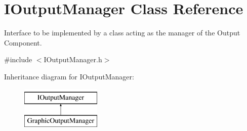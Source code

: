 \hypertarget{class_i_output_manager}{}\section{I\+Output\+Manager Class Reference}
\label{class_i_output_manager}


Interface to be implemented by a class acting as the manager of the Output Component.  




{\ttfamily \#include $<$I\+Output\+Manager.\+h$>$}

Inheritance diagram for I\+Output\+Manager\+:\begin{figure}[H]
\begin{center}
\leavevmode
\includegraphics[height=2.000000cm]{class_i_output_manager}
\end{center}
\end{figure}

